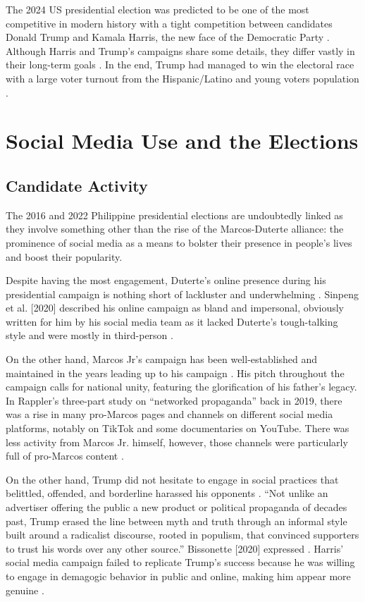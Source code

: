 The 2024 US presidential election was predicted to be one of the most competitive in modern history with a tight competition between candidates Donald Trump and Kamala Harris, the new face of the Democratic Party \cite{RRL_Setiawan-2025}. Although Harris and Trump’s campaigns share some details, they differ vastly in their long-term goals \cite{RRL_Posada-2025}. In the end, Trump had managed to win the electoral race with a large voter turnout from the Hispanic/Latino and young voters population \cite{RRL_Posada-2025}.

\section{Social Media Use and the Elections}
\subsection{Candidate Activity}
The 2016 and 2022 Philippine presidential elections are undoubtedly linked as they involve something other than the rise of the Marcos-Duterte alliance: the prominence of social media as a means to bolster their presence in people’s lives and boost their popularity.

Despite having the most engagement, Duterte’s online presence during his presidential campaign is nothing short of lackluster and underwhelming \cite{RRL_Sinpeng-2020}. Sinpeng et al. [2020] described his online campaign as bland and impersonal, obviously written for him by his social media team as it lacked Duterte’s tough-talking style and were mostly in third-person \cite{RRL_Sinpeng-2020}.

On the other hand, Marcos Jr’s campaign has been well-established and maintained in the years leading up to his campaign \cite{RRL_Mendoza-2022}. His pitch throughout the campaign calls for national unity, featuring the glorification of his father’s legacy. In Rappler’s three-part study on “networked propaganda” back in 2019, there was a rise in many pro-Marcos pages and channels on different social media platforms, notably on TikTok and some documentaries on YouTube. There was less activity from Marcos Jr. himself, however, those channels were particularly full of pro-Marcos content \cite{RRL_Mendoza-2022}.

On the other hand, Trump did not hesitate to engage in social practices that belittled, offended, and borderline harassed his opponents \cite{RRL_Posada-2025}. “Not unlike an advertiser offering the public a new product or political propaganda of decades past, Trump erased the line between myth and truth through an informal style built around a radicalist discourse, rooted in populism, that convinced supporters to trust his words over any other source.” Bissonette [2020] expressed \cite{RRL_Bissonette-2020}. Harris’ social media campaign failed to replicate Trump’s success because he was willing to engage in demagogic behavior in public and online, making him appear more genuine \cite{RRL_Posada-2025}.

